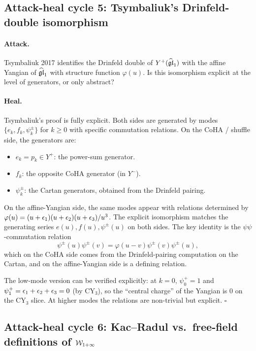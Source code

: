\subsection{Attack-heal cycle 5: Tsymbaliuk's Drinfeld-double isomorphism}
\label{opus:sec:ah-5-tsymbaliuk}

\paragraph{Attack.}
Tsymbaliuk 2017 identifies the Drinfeld double of $Y^+(\widehat{\mathfrak{gl}}_1)$ with the affine
Yangian of $\widehat{\mathfrak{gl}}_1$ with structure function $\varphi(u)$. Is this isomorphism explicit
at the level of generators, or only abstract?

\paragraph{Heal.}
Tsymbaliuk's proof is fully explicit. Both sides are generated by modes $\{e_k, f_k, \psi^\pm_k\}$
for $k \geq 0$ with specific commutation relations. On the CoHA / shuffle side, the generators are:
\begin{itemize}
\item $e_k = p_k \in Y^+$: the power-sum generator.
\item $f_k$: the opposite CoHA generator (in $Y^-$).
\item $\psi^\pm_k$: the Cartan generators, obtained from the Drinfeld pairing.
\end{itemize}
On the affine-Yangian side, the same modes appear with relations determined by
$\varphi(u) = (u + \epsilon_1)(u + \epsilon_2)(u + \epsilon_3)/u^3$. The explicit isomorphism
matches the generating series $e(u), f(u), \psi^\pm(u)$ on both sides. The key identity
is the $\psi\psi$-commutation relation
\[
 \psi^\pm(u) \psi^\pm(v) = \varphi(u - v) \psi^\pm(v) \psi^\pm(u),
\]
which on the CoHA side comes from the Drinfeld-pairing computation on the Cartan,
and on the affine-Yangian side is a defining relation.

The low-mode version can be verified explicitly: at $k = 0$, $\psi_0^+ = 1$ and
$\psi_1^+ = \epsilon_1 + \epsilon_2 + \epsilon_3 = 0$ (by CY$_3$), so the ``central charge'' of
the Yangian is $0$ on the CY$_3$ slice. At higher modes the relations are non-trivial
but explicit.
\hfill$\square$

\subsection{Attack-heal cycle 6: Kac--Radul vs.\ free-field definitions of $\mathcal{W}_{1+\infty}$}
\label{opus:sec:ah-6-W-inf}

